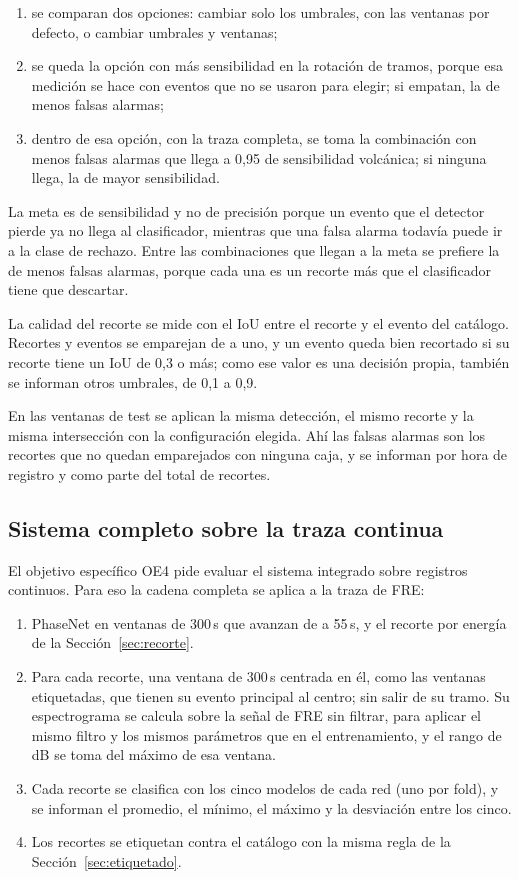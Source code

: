 \begin{enumerate}
\item se comparan dos opciones: cambiar solo los umbrales, con las ventanas por
  defecto, o cambiar umbrales y ventanas;
\item se queda la opción con más sensibilidad en la rotación de tramos, porque
  esa medición se hace con eventos que no se usaron para elegir; si empatan, la
  de menos falsas alarmas;
\item dentro de esa opción, con la traza completa, se toma la combinación con
  menos falsas alarmas que llega a 0,95 de sensibilidad volcánica; si ninguna
  llega, la de mayor sensibilidad.
\end{enumerate}

La meta es de sensibilidad y no de precisión porque un evento que el detector
pierde ya no llega al clasificador, mientras que una falsa alarma todavía puede
ir a la clase de rechazo. Entre las combinaciones que llegan a la meta se
prefiere la de menos falsas alarmas, porque cada una es un recorte más que el
clasificador tiene que descartar.

La calidad del recorte se mide con el IoU entre el recorte y el evento del
catálogo. Recortes y eventos se emparejan de a uno, y un evento queda bien
recortado si su recorte tiene un IoU de 0,3 o más; como ese valor es una
decisión propia, también se informan otros umbrales, de 0,1 a 0,9.

En las ventanas de test se aplican la misma detección, el mismo recorte y la
misma intersección con la configuración elegida. Ahí las falsas alarmas son los
recortes que no quedan emparejados con ninguna caja, y se informan por hora de
registro y como parte del total de recortes.

\subsection{Sistema completo sobre la traza continua}
\label{subsec:protocolo-sistema}

El objetivo específico OE4 pide evaluar el sistema integrado sobre registros
continuos. Para eso la cadena completa se aplica a la traza de FRE:

\begin{enumerate}
\item PhaseNet en ventanas de 300\,s que avanzan de a 55\,s, y el recorte por
  energía de la Sección~\ref{sec:recorte}.
\item Para cada recorte, una ventana de 300\,s centrada en él, como las
  ventanas etiquetadas, que tienen su evento principal al centro; sin salir de
  su tramo. Su espectrograma se calcula sobre la señal de FRE sin filtrar,
  para aplicar el mismo filtro y los mismos parámetros que en el entrenamiento,
  y el rango de dB se toma del máximo de esa ventana.
\item Cada recorte se clasifica con los cinco modelos de cada red (uno por
  fold), y se informan el promedio, el mínimo, el máximo y la desviación entre
  los cinco.
\item Los recortes se etiquetan contra el catálogo con la misma regla de la
  Sección~\ref{sec:etiquetado}.
\end{enumerate}

